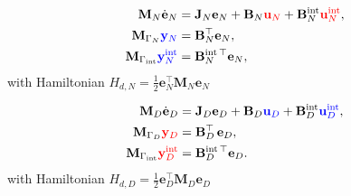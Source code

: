 \documentclass[aspectratio=169]{ISAE-Beamer}
\begin{document}
\begin{frame}
\begin{tcbraster}[raster columns=2, raster equal height]
	\begin{tcolorbox}[width=0.48\textwidth, nobeforeafter, colframe=red,title=Subdomain $\Omega_N$,  coltitle=black]%
		\begin{equation*}
		\begin{aligned}
		\mathbf{M}_N {\dot{\mathbf{e}}_N} &= \mathbf{J}_N \mathbf{e}_N  + \mathbf{B}_N \textcolor{red}{\mathbf{u}_N} + \mathbf{B}_{N}^{\text{int}} \textcolor{red}{\mathbf{u}_N^{\text{int}}}, \\
		\mathbf{M}_{\Gamma_N} \textcolor{blue}{\mathbf{y}_N} &= \mathbf{B}_{N}^\top \mathbf{e}_N, \\
		\mathbf{M}_{\Gamma_{\text{int}}} \textcolor{blue}{\mathbf{y}_N^{\text{int}}} &=  \mathbf{B}_{N}^{\text{int}\, \top} \mathbf{e}_N, \\
		\end{aligned}
		\end{equation*}
		with Hamiltonian $H_{d, N} = \frac{1}{2} {\mathbf{e}}_{N}^\top \mathbf{M}_N {{\mathbf{e}}_N}$
	\end{tcolorbox} 
	\begin{tcolorbox}[width=0.48\textwidth, nobeforeafter,  colframe=cyan,title=Subdomain $\Omega_D$, coltitle=black]%
		\begin{equation*}
		\begin{aligned}
		\mathbf{M}_D \dot{\mathbf{e}}_D &= \mathbf{J}_D \mathbf{e}_D + \mathbf{B}_D \textcolor{blue}{\mathbf{u}_D} + \mathbf{B}_{D}^{\text{int}} \textcolor{blue}{\mathbf{u}_D^{\text{int}}}, \\
		\mathbf{M}_{\Gamma_D} \textcolor{red}{\mathbf{y}_D} &= \mathbf{B}_{D}^\top \, \mathbf{e}_D, \\
		\mathbf{M}_{\Gamma_{\text{int}}} \textcolor{red}{\mathbf{y}_D^{\text{int}}} &= \mathbf{B}_{D}^{\text{int}\, \top} \mathbf{e}_D. \\
		\end{aligned}
		\end{equation*}
		with Hamiltonian $H_{d, D} = \frac{1}{2} {\mathbf{e}}_{D}^\top \mathbf{M}_D {{\mathbf{e}}_D}$
	\end{tcolorbox}
\end{tcbraster}
\end{frame}
\end{document}
